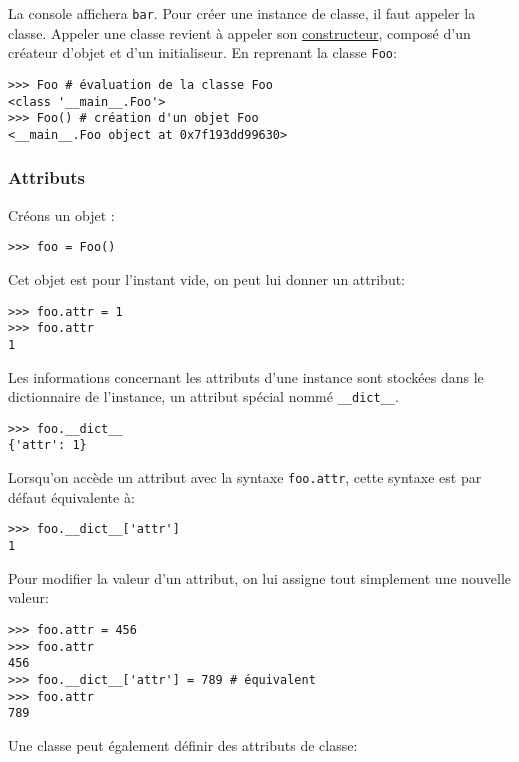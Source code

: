 La console affichera \texttt{bar}. Pour créer une instance de classe, il faut appeler la classe. Appeler une classe revient à appeler son \hyperref[constructeur]{constructeur}, composé d'un créateur d'objet et d'un initialiseur. En reprenant la classe \texttt{Foo}:

\begin{verbatim}
>>> Foo # évaluation de la classe Foo
<class '__main__.Foo'>
>>> Foo() # création d'un objet Foo
<__main__.Foo object at 0x7f193dd99630>
\end{verbatim}

\subsubsection{Attributs}

Créons un objet :

\begin{verbatim}
>>> foo = Foo()
\end{verbatim}

Cet objet est pour l'instant vide, on peut lui donner un attribut:

\begin{verbatim}
>>> foo.attr = 1
>>> foo.attr
1
\end{verbatim}

Les informations concernant les attributs d'une instance sont stockées dans le dictionnaire de l'instance, un attribut spécial nommé \texttt{__dict__}.

\begin{verbatim}
>>> foo.__dict__
{'attr': 1}
\end{verbatim}

Lorsqu'on accède un attribut avec la syntaxe \texttt{foo.attr}, cette syntaxe est par défaut équivalente à:

\begin{verbatim}
>>> foo.__dict__['attr']
1
\end{verbatim}

Pour modifier la valeur d'un attribut, on lui assigne tout simplement une nouvelle valeur:

\begin{verbatim}
>>> foo.attr = 456
>>> foo.attr
456
>>> foo.__dict__['attr'] = 789 # équivalent
>>> foo.attr
789
\end{verbatim}

Une classe peut également définir des attributs de classe:

